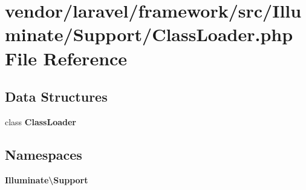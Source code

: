 \section{vendor/laravel/framework/src/\+Illuminate/\+Support/\+Class\+Loader.php File Reference}
\label{laravel_2framework_2src_2_illuminate_2_support_2_class_loader_8php}
\subsection*{Data Structures}
\begin{DoxyCompactItemize}
\item 
class {\bf Class\+Loader}
\end{DoxyCompactItemize}
\subsection*{Namespaces}
\begin{DoxyCompactItemize}
\item 
 {\bf Illuminate\textbackslash{}\+Support}
\end{DoxyCompactItemize}
